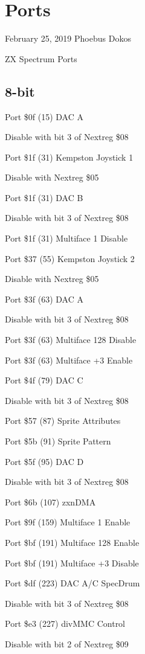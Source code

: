 \chapter{Ports}

February 25, 2019  Phoebus Dokos

\begin{table}[h]\centering\tiny
  \caption{ZX Spectrum Ports}
\end{table}

\section{8-bit}
Port \$0f (15) DAC A

Disable with bit 3 of Nextreg \$08

Port \$1f (31) Kempston Joystick 1

Disable with Nextreg \$05

Port \$1f (31) DAC B

Disable with bit 3 of Nextreg \$08

Port \$1f (31) Multiface 1 Disable

Port \$37 (55) Kempston Joystick 2

Disable with Nextreg \$05

Port \$3f (63) DAC A

Disable with bit 3 of Nextreg \$08

Port \$3f (63) Multiface 128 Disable

Port \$3f (63) Multiface +3 Enable

Port \$4f (79) DAC C

Disable with bit 3 of Nextreg \$08

Port \$57 (87) Sprite Attributes

Port \$5b (91) Sprite Pattern

Port \$5f (95) DAC D

Disable with bit 3 of Nextreg \$08

Port \$6b (107) zxnDMA

Port \$9f (159) Multiface 1 Enable

Port \$bf (191) Multiface 128 Enable

Port \$bf (191) Multiface +3 Disable

Port \$df (223) DAC A/C SpecDrum

Disable with bit 3 of Nextreg \$08

Port \$e3 (227) divMMC Control

Disable with bit 2 of Nextreg \$09

